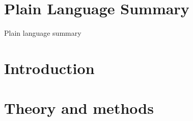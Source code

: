 \documentclass[draft]{agujournal2019}
\begin{document}
\section*{Plain Language Summary}
Plain language summary


%
%

%


%
%
%
%


\section{Introduction}

\section{Theory and methods}
\end{document}
